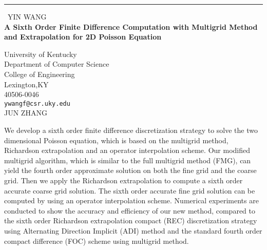 \documentclass{report}
\begin{document}
\begin{center}
\rule{6in}{1pt} \
{\large YIN WANG \\
{\bf A Sixth Order Finite Difference Computation with Multigrid Method and Extrapolation for 2D Poisson Equation}}

University of Kentucky \\ Department of Computer Science \\ College of Engineering \\ Lexington,KY \\ 40506-0046
\\
{\tt ywangf@csr.uky.edu}\\
JUN ZHANG\end{center}

We develop a sixth order finite difference discretization strategy
to solve the two dimensional Poisson equation, which is based on the multigrid
method, Richardson extrapolation and an operator interpolation scheme. Our modified
multigrid algorithm, which is similar to the full multigrid method (FMG), can
yield the fourth order approximate solution on both the fine grid and the
coarse grid. Then we apply the Richardson extrapolation to compute a
sixth order accurate coarse grid solution. The sixth order accurate fine
grid solution can be computed by using
an operator interpolation scheme. Numerical experiments are conducted to show the
accuracy and efficiency of our new method, compared to the sixth order Richardson
extrapolation compact (REC) discretization strategy using Alternating Direction
Implicit (ADI) method and the standard fourth order compact difference (FOC)
scheme using multigrid method.
\end{document}
